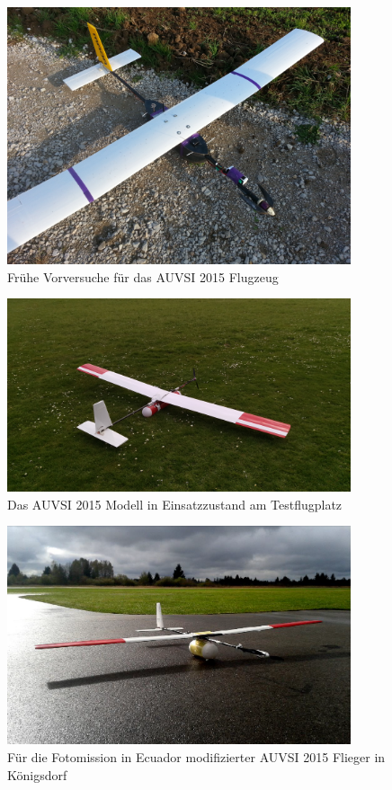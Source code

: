 \begin{figure}[H]
\centering
\includegraphics[width=0.9\textwidth]{bilder/Fotos/AUVSI-MAYA-Hybrid.jpg} 
\caption{Frühe Vorversuche für das AUVSI 2015 Flugzeug} 
\label{Frühe Vorversuche für das AUVSI 2015 Flugzeug}
\end{figure}

\begin{figure}[H]
\centering
\includegraphics[width=0.9\textwidth]{bilder/Fotos/AUVSI_2015.jpg} 
\caption{Das AUVSI 2015 Modell in Einsatzzustand am Testflugplatz} 
\label{Das AUVSI 2015 Modell in Einsatzzustand am Testflugplatz}
\end{figure}

\begin{figure}[H]
\centering
\includegraphics[width=0.9\textwidth]{bilder/Fotos/Ecuadorflieger_Koenigsdorf.png} 
\caption{Für die Fotomission in Ecuador modifizierter AUVSI 2015 Flieger in Königsdorf} 
\label{Für die Fotomission in Ecuador modifizierter AUVSI 2015 Flieger in Königsdorf}
\end{figure}

